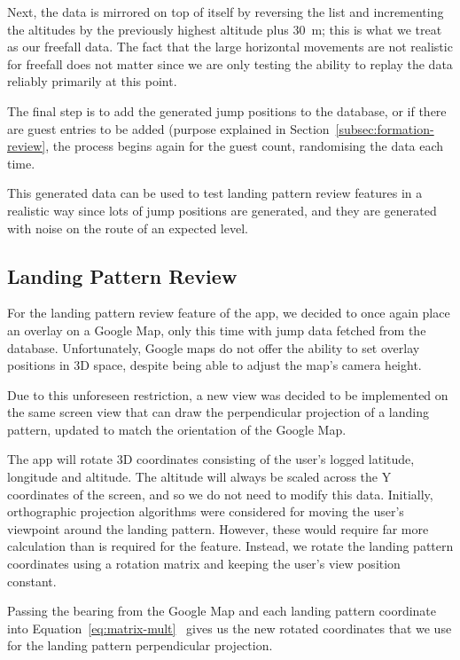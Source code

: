 Next, the data is mirrored on top of itself by reversing the list and incrementing the altitudes by the previously highest altitude plus \SI{30}{\metre}; this is what we treat as our freefall data. The fact that the large horizontal movements are not realistic for freefall does not matter since we are only testing the ability to replay the data reliably primarily at this point.

The final step is to add the generated jump positions to the database, or if there are guest entries to be added (purpose explained in Section~\vref{subsec:formation-review}, the process begins again for the guest count, randomising the data each time.

This generated data can be used to test landing pattern review features in a realistic way since lots of jump positions are generated, and they are generated with noise on the route of an expected level.

\subsection{Landing Pattern Review}
For the landing pattern review feature of the app, we decided to once again place an overlay on a Google Map, only this time with jump data fetched from the database. Unfortunately, Google maps do not offer the ability to set overlay positions in 3D space, despite being able to adjust the map's camera height.

Due to this unforeseen restriction, a new view was decided to be implemented on the same screen view that can draw the perpendicular projection of a landing pattern, updated to match the orientation of the Google Map.

The app will rotate 3D coordinates consisting of the user's logged latitude, longitude and altitude.
The altitude will always be scaled across the Y coordinates of the screen, and so we do not need to modify this data. Initially, orthographic projection algorithms were considered for moving the user's viewpoint around the landing pattern. However, these would require far more calculation than is required for the feature. Instead, we rotate the landing pattern coordinates using a rotation matrix and keeping the user's view position constant.

Passing the bearing from the Google Map and each landing pattern coordinate into Equation~\vref{eq:matrix-mult}~\cite{lounesto_clifford_2001} gives us the new rotated coordinates that we use for the landing pattern perpendicular projection.

